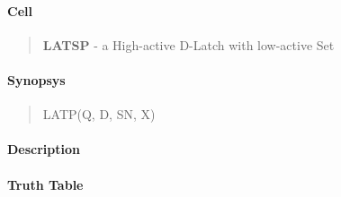 \label{LATSP}
\paragraph{Cell}
\begin{quote}
    \textbf{LATSP} - a High-active D-Latch with low-active Set
\end{quote}

\paragraph{Synopsys}
\begin{quote}
    LATP(Q, D, SN, X)
\end{quote}

\paragraph{Description}

%

\paragraph{Truth Table}
%

